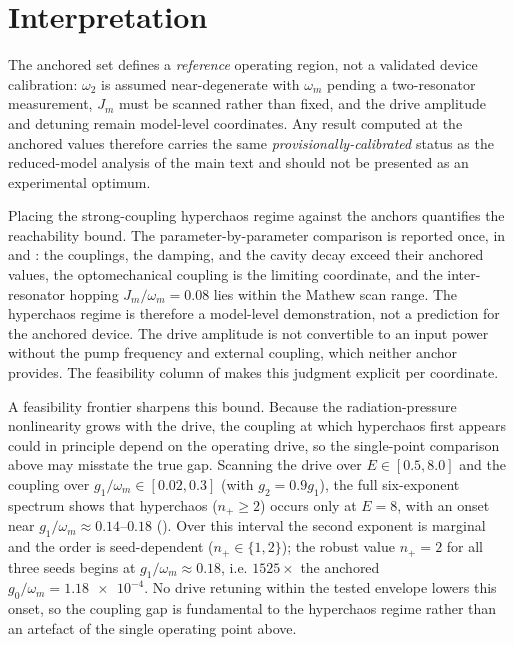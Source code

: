 \documentclass[preprint,numbers,a4paper]{elsarticle}
\begin{document}
\section{Interpretation}
\label{SI-sec:interpretation}

The anchored set defines a \emph{reference} operating region, not a validated device calibration: $\omega_2$ is assumed near-degenerate with $\omega_m$ pending a two-resonator measurement, $J_m$ must be scanned rather than fixed, and the drive amplitude and detuning remain model-level coordinates. Any result computed at the anchored values therefore carries the same \emph{provisionally-calibrated} status as the reduced-model analysis of the main text and should not be presented as an experimental optimum.

Placing the strong-coupling hyperchaos regime against the anchors quantifies the reachability bound. The parameter-by-parameter comparison is reported once, in  and : the couplings, the damping, and the cavity decay exceed their anchored values, the optomechanical coupling is the limiting coordinate, and the inter-resonator hopping $J_m/\omega_m=\num{0.08}$ lies within the Mathew scan range. The hyperchaos regime is therefore a model-level demonstration, not a prediction for the anchored device. The drive amplitude is not convertible to an input power without the pump frequency and external coupling, which neither anchor provides. The feasibility column of  makes this judgment explicit per coordinate.

A feasibility frontier sharpens this bound. Because the radiation-pressure nonlinearity grows with the drive, the coupling at which hyperchaos first appears could in principle depend on the operating drive, so the single-point comparison above may misstate the true gap. Scanning the drive over $E\in[\num{0.5},\num{8.0}]$ and the coupling over $g_1/\omega_m\in[\num{0.02},\num{0.3}]$ (with $g_2=\num{0.9}g_1$), the full six-exponent spectrum shows that hyperchaos ($n_+\ge2$) occurs only at $E=\num{8}$, with an onset near $g_1/\omega_m\approx\num{0.14}$--$\num{0.18}$ (). Over this interval the second exponent is marginal and the order is seed-dependent ($n_+\in\{1,2\}$); the robust value $n_+=2$ for all three seeds begins at $g_1/\omega_m\approx\num{0.18}$, i.e. $\num{1525}\times$ the anchored $g_0/\omega_m=\num{1.18e-4}$. No drive retuning within the tested envelope lowers this onset, so the coupling gap is fundamental to the hyperchaos regime rather than an artefact of the single operating point above.
\end{document}
